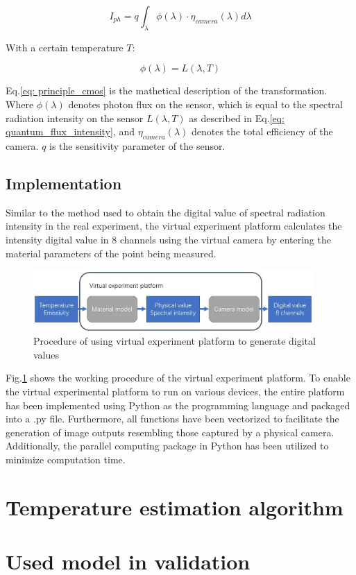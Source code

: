 \begin{equation}
    \label{eq: principle_cmos}
    I_{ph} = q \int_{\lambda}^{} \phi(\lambda) \cdot \eta_{camera}(\lambda) d\lambda
\end{equation}

With a certain temperature $T$: 

\begin{equation}
    \label{eq: quantum_flux_intensity}
    \phi(\lambda) = L(\lambda, T)
\end{equation}

Eq.\ref{eq: principle_cmos} is the mathetical description of the 
transformation. Where $\phi(\lambda)$ denotes photon flux on the sensor, 
which is equal to the spectral radiation intensity on the sensor $L(\lambda, T)$ as 
described in Eq.\ref{eq: quantum_flux_intensity}, and $\eta_{camera}(\lambda)$
denotes the total efficiency of the camera. $q$ is the sensitivity parameter 
of the sensor.


\subsection{Implementation}
Similar to the method used to obtain the digital value of spectral radiation intensity 
in the real experiment, the virtual experiment platform calculates the 
intensity digital value in 8 channels using the virtual camera by entering 
the material parameters of the point being measured.


\begin{figure}[htbp]
    \centering
    \includegraphics[width=0.95\textwidth]{figures/camera_model.jpg}
    \caption{Procedure of using virtual experiment platform to generate digital values}
    \label{fig: process_virtual_platform}
\end{figure}

Fig.\ref{fig: process_virtual_platform} shows the working procedure of the 
virtual experiment platform. 
To enable the virtual experimental platform to run on various devices, 
the entire platform has been implemented using Python as the 
programming language and packaged into a .py file. Furthermore, all 
functions have been vectorized to facilitate the generation of image 
outputs resembling those captured by a physical camera. Additionally, 
the parallel computing package in Python has been utilized to minimize 
computation time.


\section{Temperature estimation algorithm}


\section{Used model in validation}%

%
%
